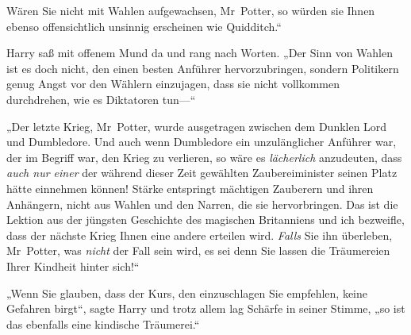 Wären Sie nicht mit Wahlen aufgewachsen, Mr~Potter, so würden sie Ihnen ebenso offensichtlich unsinnig erscheinen wie Quidditch.“

Harry saß mit offenem Mund da und rang nach Worten. „Der Sinn von Wahlen ist es doch nicht, den einen besten Anführer hervorzubringen, sondern Politikern genug Angst vor den Wählern einzujagen, dass sie nicht vollkommen durchdrehen, wie es Diktatoren tun—“

„Der letzte Krieg, Mr~Potter, wurde ausgetragen zwischen dem Dunklen Lord und Dumbledore. Und auch wenn Dumbledore ein unzulänglicher Anführer war, der im Begriff war, den Krieg zu verlieren, so wäre es \emph{lächerlich} anzudeuten, dass \emph{auch nur einer} der während dieser Zeit gewählten Zaubereiminister seinen Platz hätte einnehmen können! Stärke entspringt mächtigen Zauberern und ihren Anhängern, nicht aus Wahlen und den Narren, die sie hervorbringen. Das ist die Lektion aus der jüngsten Geschichte des magischen Britanniens und ich bezweifle, dass der nächste Krieg Ihnen eine andere erteilen wird. \emph{Falls} Sie ihn überleben, Mr~Potter, was \emph{nicht} der Fall sein wird, es sei denn Sie lassen die Träumereien Ihrer Kindheit hinter sich!“

„Wenn Sie glauben, dass der Kurs, den einzuschlagen Sie empfehlen, keine Gefahren birgt“, sagte Harry und trotz allem lag Schärfe in seiner Stimme, „so ist das ebenfalls eine kindische Träumerei.“

